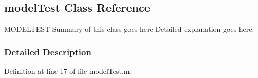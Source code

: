 \hypertarget{classmodel_test}{}\subsection{model\+Test Class Reference}
\label{classmodel_test}


M\+O\+D\+E\+L\+T\+E\+S\+T Summary of this class goes here Detailed explanation goes here.  




\subsubsection{Detailed Description}


Definition at line 17 of file model\+Test.\+m.


